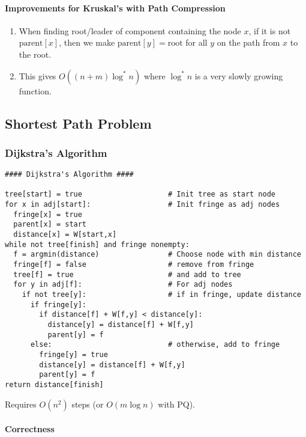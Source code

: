 \documentclass[twocolumn,english]{article}
\begin{document}
\paragraph{Improvements for Kruskal's with Path Compression}
\begin{enumerate}
\item When finding root/leader of component containing the node $x$, if
it is not $\mbox{parent}\left[x\right]$, then we make $\mbox{parent}\left[y\right]=\mbox{root}$
for all $y$ on the path from $x$ to the root.
\item This gives $O\left(\left(n+m\right)\log^{*}n\right)$ where $\log^{*}n$
is a very slowly growing function.
\end{enumerate}

\subsection{Shortest Path Problem}


\subsubsection{Dijkstra's Algorithm}

\begin{lstlisting}[basicstyle={\footnotesize\ttfamily},showstringspaces=false]
#### Dijkstra's Algorithm ####

tree[start] = true                    # Init tree as start node
for x in adj[start]:                  # Init fringe as adj nodes
  fringe[x] = true
  parent[x] = start
  distance[x] = W[start,x]
while not tree[finish] and fringe nonempty:
  f = argmin(distance)                # Choose node with min distance
  fringe[f] = false                   # remove from fringe
  tree[f] = true                      # and add to tree
  for y in adj[f]:                    # For adj nodes
    if not tree[y]:                   # if in fringe, update distance
      if fringe[y]:
        if distance[f] + W[f,y] < distance[y]:
          distance[y] = distance[f] + W[f,y]
          parent[y] = f
      else:                           # otherwise, add to fringe
        fringe[y] = true
        distance[y] = distance[f] + W[f,y]
        parent[y] = f
return distance[finish]
\end{lstlisting}


Requires $O\left(n^{2}\right)$ steps (or $O\left(m\log n\right)$
with PQ).


\paragraph{Correctness}
\end{document}
